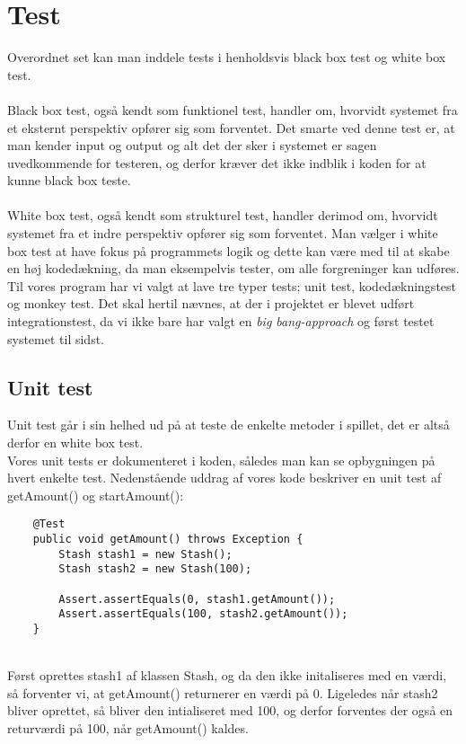 \chapter{Test}
Overordnet set kan man inddele tests i henholdsvis black box test og white box test.\\\\
Black box test, også kendt som funktionel test, handler om, hvorvidt systemet fra et eksternt perspektiv opfører sig som forventet.
Det smarte ved denne test er, at man kender input og output og alt det der sker i systemet er sagen uvedkommende for testeren, og derfor kræver det ikke indblik i koden for at kunne black box teste.\\\\
White box test, også kendt som strukturel test, handler derimod om, hvorvidt systemet fra et indre perspektiv opfører sig som forventet.
Man vælger i white box test at have fokus på programmets logik og dette kan være med til at skabe en høj kodedækning, da man eksempelvis tester, om alle forgreninger kan udføres.
\\Til vores program har vi valgt at lave tre typer tests; unit test, kodedækningstest og monkey test.
Det skal hertil nævnes, at der i projektet er blevet udført integrationstest, da vi ikke bare har valgt en \textit{big bang-approach} og først testet systemet til sidst.
\section{Unit test}
Unit test går i sin helhed ud på at teste de enkelte metoder i spillet, det er altså derfor en white box test. \\
Vores unit tests er dokumenteret i koden, således man kan se opbygningen på hvert enkelte test.
Nedenstående uddrag af vores kode beskriver en unit test af getAmount() og startAmount():\\
\begin{lstlisting}
    @Test
    public void getAmount() throws Exception {
        Stash stash1 = new Stash();
        Stash stash2 = new Stash(100);

        Assert.assertEquals(0, stash1.getAmount());
        Assert.assertEquals(100, stash2.getAmount());
    }
\end{lstlisting}
\\
Først oprettes stash1 af klassen Stash, og da den ikke initaliseres med en værdi, så forventer vi, at getAmount() returnerer en værdi på 0.
Ligeledes når stash2 bliver oprettet, så bliver den intialiseret med 100, og derfor forventes der også en returværdi på 100, når getAmount() kaldes.

